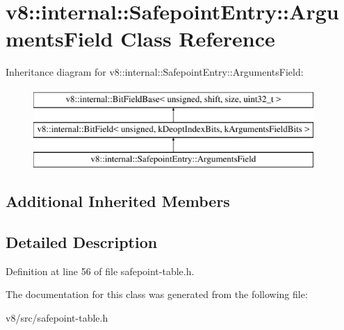 \hypertarget{classv8_1_1internal_1_1SafepointEntry_1_1ArgumentsField}{}\section{v8\+:\+:internal\+:\+:Safepoint\+Entry\+:\+:Arguments\+Field Class Reference}
\label{classv8_1_1internal_1_1SafepointEntry_1_1ArgumentsField}
Inheritance diagram for v8\+:\+:internal\+:\+:Safepoint\+Entry\+:\+:Arguments\+Field\+:\begin{figure}[H]
\begin{center}
\leavevmode
\includegraphics[height=3.000000cm]{classv8_1_1internal_1_1SafepointEntry_1_1ArgumentsField}
\end{center}
\end{figure}
\subsection*{Additional Inherited Members}


\subsection{Detailed Description}


Definition at line 56 of file safepoint-\/table.\+h.



The documentation for this class was generated from the following file\+:\begin{DoxyCompactItemize}
\item 
v8/src/safepoint-\/table.\+h\end{DoxyCompactItemize}
